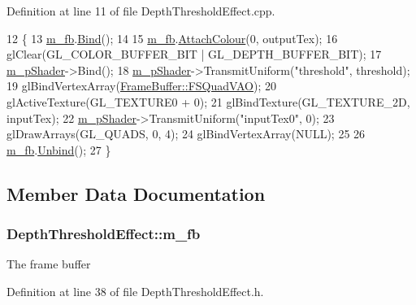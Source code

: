 Definition at line 11 of file Depth\+Threshold\+Effect.\+cpp.


\begin{DoxyCode}
12 \{
13     \hyperlink{class_depth_threshold_effect_a37003be12ef10a17d7b0d3e74b4290b1}{m\_fb}.\hyperlink{class_frame_buffer_ae7e61568475fba3b15e446c9061833ea}{Bind}();
14 
15     \hyperlink{class_depth_threshold_effect_a37003be12ef10a17d7b0d3e74b4290b1}{m\_fb}.\hyperlink{class_frame_buffer_a1556417c0dec00d1d24bdf0e84bc4c4d}{AttachColour}(0, outputTex);
16     glClear(GL\_COLOR\_BUFFER\_BIT | GL\_DEPTH\_BUFFER\_BIT);
17     \hyperlink{class_depth_threshold_effect_a46e4bba75a147b68b493f4aef1981893}{m\_pShader}->Bind();
18     \hyperlink{class_depth_threshold_effect_a46e4bba75a147b68b493f4aef1981893}{m\_pShader}->TransmitUniform(\textcolor{stringliteral}{"threshold"}, threshold);
19     glBindVertexArray(\hyperlink{class_frame_buffer_a22b0c9de2bef06e0de865684556a6677}{FrameBuffer::FSQuadVAO});
20     glActiveTexture(GL\_TEXTURE0 + 0);
21     glBindTexture(GL\_TEXTURE\_2D, inputTex);
22     \hyperlink{class_depth_threshold_effect_a46e4bba75a147b68b493f4aef1981893}{m\_pShader}->TransmitUniform(\textcolor{stringliteral}{"inputTex0"}, 0);
23     glDrawArrays(GL\_QUADS, 0, 4);
24     glBindVertexArray(NULL);
25 
26     \hyperlink{class_depth_threshold_effect_a37003be12ef10a17d7b0d3e74b4290b1}{m\_fb}.\hyperlink{class_frame_buffer_a1e114b325998ec4e4b9a9ea090d64ae8}{Unbind}();
27 \}
\end{DoxyCode}


\subsection{Member Data Documentation}
\subsubsection[{\texorpdfstring{m\+\_\+fb}{m_fb}}]{ Depth\+Threshold\+Effect\+::m\+\_\+fb\hspace{0.3cm}{\ttfamily [private]}}\hypertarget{class_depth_threshold_effect_a37003be12ef10a17d7b0d3e74b4290b1}{}\label{class_depth_threshold_effect_a37003be12ef10a17d7b0d3e74b4290b1}


The frame buffer 



Definition at line 38 of file Depth\+Threshold\+Effect.\+h.

